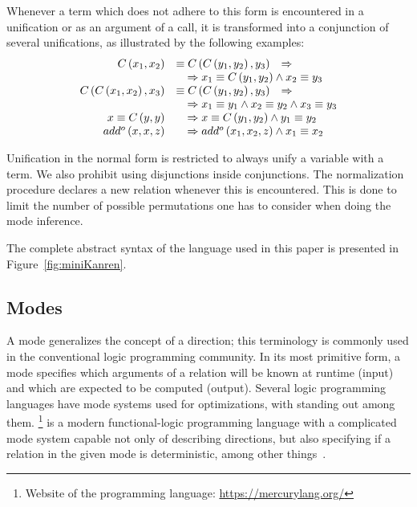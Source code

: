 Whenever a term which does not adhere to this form is encountered in a unification or as an argument of a call, it is transformed into a conjunction of several unifications, as illustrated by the following examples:
\[
    \begin{array}{rll}
        C\left( x_1, x_2 \right)                      & \equiv C\left( C\left( y_1, y_2 \right), y_3 \right)                                          & \Rightarrow \\
                                                      & \multicolumn{2}{l}{\quad\Rightarrow x_1 \equiv C\left( y_1, y_2 \right) \land x_2 \equiv y_3}               \\
        C\left( C\left( x_1, x_2 \right), x_3 \right) & \equiv C\left( C\left( y_1, y_2 \right), y_3 \right)                                          & \Rightarrow \\
                                                      & \multicolumn{2}{l}{\quad\Rightarrow x_1 \equiv y_1 \land x_2 \equiv y_2 \land x_3 \equiv y_3}               \\
        x \equiv C \left(y, y \right)                 & \multicolumn{2}{l}{\quad\Rightarrow x \equiv C \left(y_1, y_2\right) \land y_1 \equiv y_2}                  \\
        add^o\left( x, x, z \right)                   & \multicolumn{2}{l}{\quad\Rightarrow add^o\left( x_1, x_2, z \right) \land x_1 \equiv x_2}
    \end{array}
\]

Unification in the normal form is restricted to always unify a variable with a term.
We also prohibit using disjunctions inside conjunctions.
The normalization procedure declares a new relation whenever this is encountered.
This is done to limit the number of possible permutations one has to consider when doing the mode inference.

The complete abstract syntax of the \mk language used in this paper is presented in Figure~\ref{fig:miniKanren}.

\label{sec:mode}
\subsection{Modes}



A mode generalizes the concept of a direction; this terminology is commonly used in the conventional logic programming community.
In its most primitive form, a mode specifies which arguments of a relation will be known at runtime (input) and which are expected to be computed (output).
Several logic programming languages have mode systems used for optimizations, with \merc standing out among them.
\merc\footnote{Website of the \merc programming language: \url{https://mercurylang.org/}} is a modern functional-logic programming language with a complicated mode system capable not only of describing directions, but also specifying if a relation in the given mode is deterministic, among other things~\cite{overton2002constraint}.

